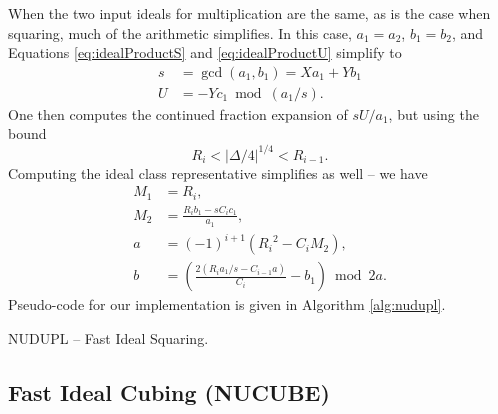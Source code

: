 \documentclass{ucalgthes1}
\theoremstyle{definition}
\newcommand{\algnewline}{\par\noindent\hskip\algorithmicindent}
\newcommand{\ZZ}{\mathbb{Z}}
\newcommand{\matrixtt}[4]{\left[ \begin{array}{rr} #1 & #2 \\ #3 & #4 \end{array} \right]}
\newcommand{\floor}[1]{\left\lfloor #1 \right\rfloor}
\begin{document}
When the two input ideals for multiplication are the same, as is the case when squaring, much of the arithmetic simplifies.  In this case, $a_1 = a_2$, $b_1 = b_2$, and Equations \ref{eq:idealProductS} and \ref{eq:idealProductU} simplify to
\begin{align*}
	s &= \gcd(a_1, b_1) = Xa_1 + Yb_1 \\
	U &= -Yc_1 \bmod (a_1/s).
\end{align*}
One then computes the continued fraction expansion of $sU/a_1$, but using the bound
\[
	R_i < |\Delta/4|^{1/4} < R_{i-1}.
\]
Computing the ideal class representative simplifies as well -- we have
\begin{align*}
	M_1 &= R_i, \\
	M_2 &= \frac{R_i b_1 - sC_i c_1}{a_1}, \\
	a &= (-1)^{i+1}({R_i}^2 - C_i M_2), \\
	b &= \left(\frac{2(R_i a_1/s  - C_{i-1} a)}{C_i} - b_1 \right) \bmod{2a}.
\end{align*}
Pseudo-code for our implementation is given in Algorithm \ref{alg:nudupl}.

\begin{algorithm}[htb]
\caption{NUDUPL -- Fast Ideal Squaring.}
\label{alg:nudupl}
\end{algorithm}

\subsection{Fast Ideal Cubing (NUCUBE)}
\label{subsec:nucube}
\end{document}
